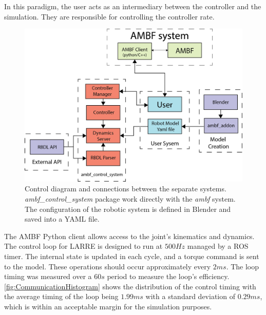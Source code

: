  In this paradigm, the user acts as an intermediary between the controller and the simulation. They are responsible for controlling the controller rate.  



  \begin{figure}[h]
    \centering
    \includegraphics[width=\columnwidth]{images/sim/AMBFSystemDiagram.png}
    \caption[AMBF Control Diagram]{Control diagram and connections between the separate systems. \textit{ambf\_control\_system} package work directly with the \textit{ambf} system. The configuration of the robotic system is defined in Blender and saved into a YAML file.} 
    \label{fig:SystemDiagram}
\end{figure}
 
 The AMBF Python client allows access to the joint's kinematics and dynamics. The control loop for LARRE is designed to run at $500Hz$ managed by a ROS timer. The internal state is updated in each cycle, and a torque command is sent to the model. These operations should occur approximately every $2ms$. The loop timing was measured over a $60s$ period to measure the loop's efficiency. \autoref{fig:CommunicationHistogram} shows the distribution of the control timing with the average timing of the loop being $1.99ms$ with a standard deviation of $0.29ms$, which is within an acceptable margin for the simulation purposes. 
 
